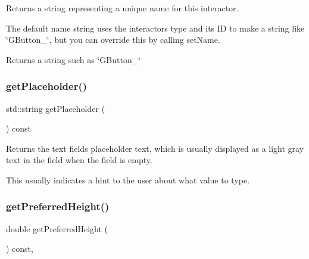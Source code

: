 Returns a string representing a unique name for this interactor. 

The default name string uses the interactor\textquotesingle{}s type and its ID to make a string like \char`\"{}\+G\+Button\+\_\char`\"{}, but you can override this by calling set\+Name. \begin{DoxyReturn}{Returns}
a string such as \char`\"{}\+G\+Button\+\_\char`\"{} 
\end{DoxyReturn}
\mbox{\label{classsgl_1_1GTextField_aa78dbaa7dac1f8cdf9048c91abecc7ad}} 
\subsubsection{\texorpdfstring{get\+Placeholder()}{getPlaceholder()}}
{\footnotesize\ttfamily std\+::string get\+Placeholder (\begin{DoxyParamCaption}{ }\end{DoxyParamCaption}) const\hspace{0.3cm}{\ttfamily [virtual]}}



Returns the text field\textquotesingle{}s placeholder text, which is usually displayed as a light gray text in the field when the field is empty. 

This usually indicates a hint to the user about what value to type. \mbox{\label{classsgl_1_1GInteractor_a747de0961653847bdc6615dbf756d715}} 
\subsubsection{\texorpdfstring{get\+Preferred\+Height()}{getPreferredHeight()}}
{\footnotesize\ttfamily double get\+Preferred\+Height (\begin{DoxyParamCaption}{ }\end{DoxyParamCaption}) const\hspace{0.3cm}{\ttfamily [virtual]}, {\ttfamily [inherited]}}



